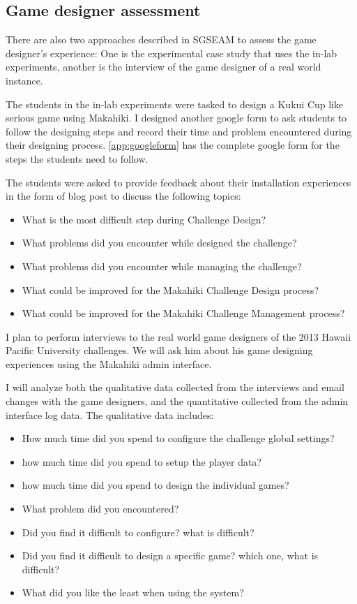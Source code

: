 \subsection{Game designer assessment}

There are also two approaches described in SGSEAM to assess the game designer's experience: One is the experimental case study that uses the in-lab experiments, another is the interview of the game designer of a real world instance.

The students in the in-lab experiments were tasked to design a Kukui Cup like serious game using Makahiki. I designed another google form to ask students to follow the designing steps and record their time and problem encountered during their designing process. \autoref{app:googleform} has the complete google form for the steps the students need to follow.

The students were asked to provide feedback about their installation experiences in the form of blog post to discuss the following topics:
\begin{itemize}
\item What is the most difficult step during Challenge Design?
\item What problems did you encounter while designed the challenge?
\item What problems did you encounter while managing the challenge?
\item What could be improved for the Makahiki Challenge Design process?
\item What could be improved for the Makahiki Challenge Management process?
\end{itemize}

I plan to perform interviews to the real world game designers of the 2013 Hawaii Pacific University challenges. We will ask him about his game designing experiences using the Makahiki admin
 interface.

I will analyze both the qualitative data collected from the interviews and email changes with the game designers, and the quantitative collected from the admin interface log data. The qualitative data includes:
\begin{itemize}
    \item How much time did you spend to configure the challenge global settings?
    \item how much time did you spend to setup the player data?
    \item how much time did you spend to design the individual games?
    \item What problem did you encountered?
    \item Did you find it difficult to configure? what is difficult?
    \item Did you find it difficult to design a specific game? which one, what is difficult?
    \item What did you like the least when using the system?
\end{itemize}

